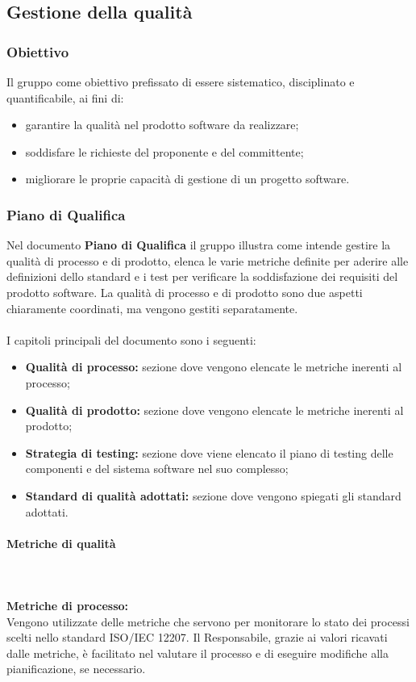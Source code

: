 \subsection{Gestione della qualità}
\subsubsection{Obiettivo}
Il gruppo \Gruppoha come obiettivo prefissato di essere sistematico, disciplinato e quantificabile, ai fini di:
\begin{itemize}
    \item garantire la qualità nel prodotto software da realizzare;
    \item soddisfare le richieste del proponente e del committente;
    \item migliorare le proprie capacità di gestione di un progetto software.
\end{itemize}

\subsubsection{Piano di Qualifica}
Nel documento \textbf{Piano di Qualifica} il gruppo \Gruppo illustra come intende gestire la qualità di processo e di prodotto, elenca le varie metriche definite per aderire alle definizioni dello standard e i test per verificare la soddisfazione dei requisiti del prodotto software.
La qualità di processo e di prodotto sono due aspetti chiaramente coordinati, ma vengono gestiti separatamente. \\ \\
I capitoli principali del documento sono i seguenti:
\begin{itemize}
    \item \textbf{Qualità di processo:} sezione dove vengono elencate le metriche inerenti al processo;
    \item \textbf{Qualità di prodotto:} sezione dove vengono elencate le metriche inerenti al prodotto;
    \item \textbf{Strategia di testing:} sezione dove viene elencato il piano di testing delle componenti e del sistema software nel suo complesso;
    \item \textbf{Standard di qualità adottati:} sezione dove vengono spiegati gli standard adottati.
\end{itemize}

\paragraph{Metriche di qualità} \mbox{} \\ \\
\textbf{Metriche di processo:}\\
Vengono utilizzate delle metriche che servono per monitorare lo stato dei processi scelti nello standard ISO/IEC 12207. Il Responsabile, grazie ai valori ricavati dalle metriche, è facilitato nel
valutare il processo e di eseguire modifiche alla pianificazione, se necessario.\\

